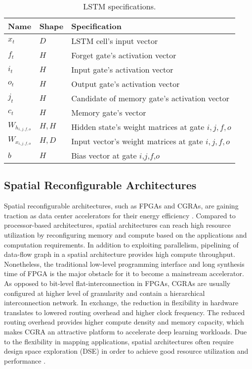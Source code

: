 \begin{table}[t]
\vskip 0.15in
\centering
\scriptsize
\begin{tabular}{p{1cm}m{1cm}m{5cm}}
\toprule
  Name & Shape & Specification \\
  \midrule
  $x_t$    & $D$      &  LSTM cell's input vector\\
  $f_t$    & $H$      &  Forget gate's activation vector\\
  $i_t$    & $H$      &  Input gate's activation vector\\
  $o_t$    & $H$      &  Output gate's activation vector\\
  $j_t$    & $H$      &  Candidate of memory gate's activation vector\\
  $c_t$    & $H$      &  Memory gate's vector \\
  $W_{h_{i,j,f,o}}$   & $H,H$    &  Hidden state's weight matrices at gate $i,j,f,o$\\
  $W_{x_{i,j,f,o}}$   & $H,D$    &  Input vector's weight matrices at gate $i,j,f,o$\\
  $b$      & $H$      &  Bias vector at gate $i$,$j$,$f$,$o$\\
\bottomrule
\end{tabular}
\caption{LSTM specifications.}
\label{tab:spec_lstm}
\vskip -0.1in
\end{table}

\subsection{Spatial Reconfigurable Architectures}
Spatial reconfigurable architectures, such as FPGAs and CGRAs, are gaining traction as data center accelerators for their
energy efficiency \cite{awsf1, catapult, baidu}.
Compared to processor-based architectures, spatial architectures can reach high resource utilization
  by reconfiguring memory and compute based on the applications and computation requirements.
In addition to exploiting parallelism, pipelining of data-flow graph in
  a spatial architecture provides high compute throughput.
Nonetheless, the traditional low-level programming
  interface and long synthesis time of FPGA is the major obstacle
  for it to become a mainstream accelerator.
As opposed to bit-level flat-interconnection in FPGAs,
  CGRAs are usually configured at higher level of granularity and contain a hierarchical interconnection network.
In exchange, the reduction in flexibility
  in hardware translates to lowered routing overhead and
  higher clock frequency.
The reduced routing
  overhead provides higher compute density and memory capacity,
  which makes CGRA an attractive
  platform to accelerate deep learning workloads.
Due to the flexibility in mapping applications,
  spatial architectures often require design space exploration (DSE)
  in order to achieve good resource
  utilization and performance \cite{dse_koeplinger, fpgadse}.

